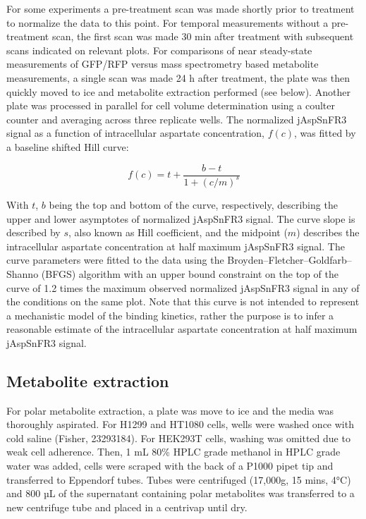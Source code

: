 \documentclass[9pt,lineno]{elife}
\begin{document}
For some experiments a pre-treatment scan was made shortly prior to treatment to normalize the data to this point.
For temporal measurements without a pre-treatment scan, the first scan was made 30 min after treatment with subsequent scans indicated on relevant plots.
For comparisons of near steady-state measurements of GFP/RFP versus mass spectrometry based metabolite measurements, a single scan was made 24 h after treatment, the plate was then quickly moved to ice and metabolite extraction performed (see below).
Another plate was processed in parallel for cell volume determination using a coulter counter and averaging across three replicate wells.
The normalized jAspSnFR3 signal as a function of intracellular aspartate concentration, $f(c)$, was fitted by a baseline shifted Hill curve:

$$
f(c) = t + \frac{b - t}{1 + (c/m)^s}
$$

With $t$, $b$ being the top and bottom of the curve, respectively, describing the upper and lower asymptotes of normalized jAspSnFR3 signal.
The curve slope is described by $s$, also known as Hill coefficient, and the midpoint ($m$) describes the intracellular aspartate concentration at half maximum jAspSnFR3 signal.
The curve parameters were fitted to the data using the Broyden–Fletcher–Goldfarb–Shanno (BFGS) algorithm with an upper bound constraint on the top of the curve of 1.2 times the maximum observed normalized jAspSnFR3 signal in any of the conditions on the same plot.
Note that this curve is not intended to represent a mechanistic model of the binding kinetics, rather the purpose is to infer a reasonable estimate of the intracellular aspartate concentration at half maximum jAspSnFR3 signal.

\subsection{Metabolite extraction}
For polar metabolite extraction, a plate was move to ice and the media was thoroughly aspirated.
For H1299 and HT1080 cells, wells were washed once with cold saline (Fisher, 23293184).
For HEK293T cells, washing was omitted due to weak cell adherence.
Then, 1 mL 80\% HPLC grade methanol in HPLC grade water was added, cells were scraped with the back of a P1000 pipet tip and transferred to Eppendorf tubes.
Tubes were centrifuged (17,000g, 15 mins, 4°C) and 800 µL of the supernatant containing polar metabolites was transferred to a new centrifuge tube and placed in a centrivap until dry.
\end{document}
